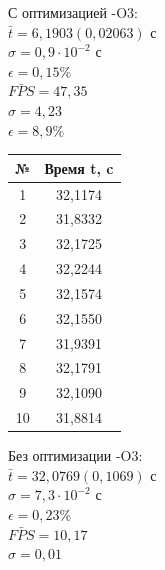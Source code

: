 \documentclass[12pt, letterpaper]{article}
\begin{document}
     С оптимизацией -O3:\\

    $\bar{t} = 6,1903 (0,02063)$ с\\

    $\sigma = 0,9 \cdot 10^{-2}$ с\\

    $\epsilon = 0,15\%$\\

    $\bar{FPS} = 47,35$\\

    $\sigma = 4,23$\\

    $\epsilon = 8,9\%$\\

    \newpage
    \begin{table}
        \begin{tabular}{cc}
        \toprule             %
        \textbf{№} & \textbf{Время t, c} \\
        \midrule             %
        1 & 32,1174 \\
        2 & 31,8332 \\
        3 & 32,1725 \\
        4 & 32,2244 \\
        5 & 32,1574 \\
        6 & 32,1550 \\
        7 & 31,9391 \\
        8 & 32,1791 \\
        9 & 32,1090 \\
        10 & 31,8814 \\
        \bottomrule          %
        \end{tabular}
    \end{table}

    Без оптимизации -O3:\\

    $\bar{t} = 32,0769 (0,1069)$ с\\

    $\sigma = 7,3 \cdot 10^{-2}$ с\\

    $\epsilon = 0,23\%$\\

    $\bar{FPS} = 10,17$\\

    $\sigma = 0,01$\\
\end{document}
